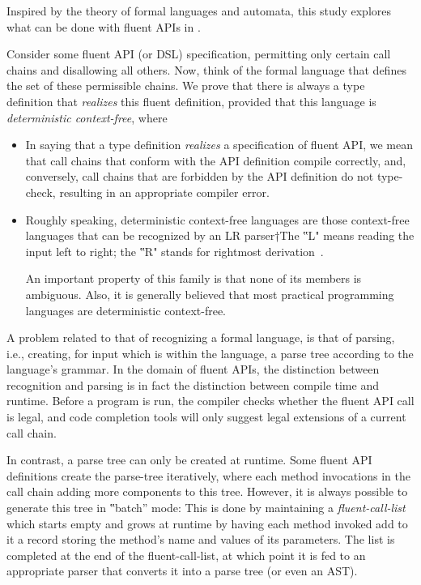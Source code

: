 \documentclass[a4paper,USenglish]{lipics-v2016}
\numberwithin{equation}{section}
\numberwithin{figure}{section}
\begin{document}
Inspired by the theory of formal languages and automata,
  this study explores what can be done with fluent APIs in \Java.

Consider some fluent API (or DSL) specification, permitting only certain call
chains and disallowing all others.
Now, think of the formal language that defines the set of these permissible chains.
We prove that there is always a \Java type definition that
  \emph{realizes} this fluent definition, provided that this
  language is \emph{deterministic context-free}, where
\begin{itemize}
  \item In saying that a type definition \emph{realizes} a specification of fluent
    API, we mean that call chains that conform with the API definition compile
    correctly, and, conversely, call chains that are forbidden by the API
    definition do not type-check, resulting in an appropriate compiler error.
  \item Roughly speaking, deterministic context-free languages are those
    context-free languages that can be recognized by an LR parser†{The ‟L"
    means reading the input left to right; the ‟R" stands for rightmost derivation}~\cite{Aho:Sethi:Ullman:86}.
    \par
    An important property of this family is that none of its members is ambiguous.
    Also, it is generally believed that most practical programming languages
    are deterministic context-free.
\end{itemize}

A problem related to that of recognizing a formal language,
is that of parsing, i.e., creating, for input which is within the language,
  a parse tree according to the language's grammar.
In the domain of fluent APIs, the distinction between recognition and parsing is
  in fact the distinction between compile time and runtime.
Before a program is run, the compiler checks whether the fluent API call is legal,
  and code completion tools will only suggest legal extensions of a current call chain.

In contrast, a parse tree can only be created at runtime.
Some fluent API definitions create the parse-tree
  iteratively, where each method invocations in the call chain adding
  more components to this tree.
However, it is always possible to generate this tree in ‟batch” mode:
This is done by maintaining a \emph{fluent-call-list} which
  starts empty and grows at runtime by having each method invoked add to it
  a record storing the method's name and values of its parameters.
The list is completed at the end of the fluent-call-list, at which point it is fed to an appropriate parser that
  converts it into a parse tree (or even an AST).
\end{document}
